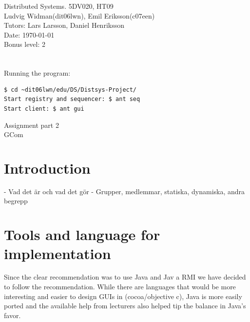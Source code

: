 \documentclass[english]{article}
\def\author			{Ludvig Widman(dit06lwn), Emil Eriksson(c07een)}
\def\course			{Distributed Systems. 5DV020, HT09}
\def\delivery		{Assignment part 2}
\def\trivialname	{GCom}
\def\tutor			{Lars Larsson, Daniel Henriksson}
\begin{document}
\begin{titlepage}
\noindent
\course \\
\author \\

\noindent
Tutors: \tutor \\
Date: \today \\
Bonus level: 2\\
\\
\\
Running the program: 
\begin{verbatim}
$ cd ~dit06lwn/edu/DS/Distsys-Project/
Start registry and sequencer: $ ant seq
Start client: $ ant gui
\end{verbatim}

\begin{center}
	\vspace{20mm}
        \Huge \delivery \\
        \vspace{5mm}
        \Huge \trivialname \\
        \vspace{20mm}
        
\end{center}

\end{titlepage}
\thispagestyle{empty}
\tableofcontents
\newpage
{}

\setlength{\parindent}{0pt}
\setlength{\parskip}{1ex plus 0.5ex minus 0.2ex}


\section{Introduction}
- Vad det är och vad det gör
- Grupper, medlemmar, statiska, dynamiska, andra begrepp


\section{Tools and language for implementation}
Since the clear recommendation was to use Java and Jav                                                                                    a RMI we have decided to follow the recommendation. While there are languages that would be more interesting and easier to design GUIs in (cocoa/objective c), Java is more easily ported and the available help from lecturers also helped tip the balance in Java's favor.
\end{document}
